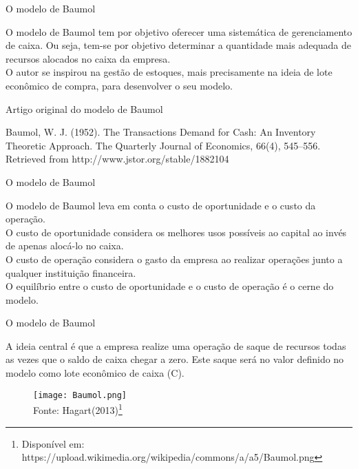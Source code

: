 \documentclass[10pt]{beamer}
\begin{document}
\begin{frame}[fragile]{O modelo de Baumol}

O modelo de Baumol tem por objetivo oferecer uma sistemática de gerenciamento de caixa. Ou seja, tem-se por objetivo determinar a quantidade mais adequada de recursos alocados no caixa da empresa.\\ O autor se inspirou na gestão de estoques, mais precisamente na ideia de lote econômico de compra, para desenvolver o seu modelo.

\end{frame}


\begin{frame}[fragile]{Artigo original do modelo de Baumol}

Baumol, W. J. (1952). The Transactions Demand for Cash: An Inventory Theoretic Approach. The Quarterly Journal of Economics, 66(4), 545–556. Retrieved from http://www.jstor.org/stable/1882104

\end{frame}

\begin{frame}[fragile]{O modelo de Baumol}

O modelo de Baumol leva em conta o custo de oportunidade e o custo da operação. \\
O custo de oportunidade considera os melhores usos possíveis ao capital ao invés de apenas alocá-lo no caixa.\\
O custo de operação considera o gasto da empresa ao realizar operações junto a qualquer instituição financeira.\\
O equilíbrio entre o custo de oportunidade e o custo de operação é o cerne do modelo.

\end{frame}

\begin{frame}[fragile]{O modelo de Baumol}

A ideia central é que a empresa realize uma operação de saque de recursos todas as vezes que o saldo de caixa chegar a zero. Este saque será no valor definido no modelo como lote econômico de caixa (C).\\
\begin{figure}
  \begin{center}
    \texttt{[image: Baumol.png]}
    \label{fig:Baumol}
     \\ \tiny Fonte: Hagart(2013)\footnote{\tiny Disponível em: https://upload.wikimedia.org/wikipedia/commons/a/a5/Baumol.png}
  \end{center}
\end{figure}

\end{frame}
\end{document}
